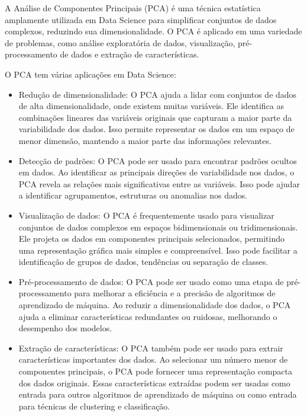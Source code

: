 \documentclass[12pt, a4paper]{article}
\begin{document}
A Análise de Componentes Principais (PCA) é uma técnica estatística amplamente utilizada em Data Science para simplificar conjuntos de dados complexos, reduzindo sua dimensionalidade. O PCA é aplicado em uma variedade de problemas, como análise exploratória de dados, visualização, pré-processamento de dados e extração de características.

O PCA tem várias aplicações em Data Science:

\begin{itemize}
    \item Redução de dimensionalidade: O PCA ajuda a lidar com conjuntos de dados de alta dimensionalidade, onde existem muitas variáveis. Ele identifica as combinações lineares das variáveis originais que capturam a maior parte da variabilidade dos dados. Isso permite representar os dados em um espaço de menor dimensão, mantendo a maior parte das informações relevantes.
    
    \item Detecção de padrões: O PCA pode ser usado para encontrar padrões ocultos em dados. Ao identificar as principais direções de variabilidade nos dados, o PCA revela as relações mais significativas entre as variáveis. Isso pode ajudar a identificar agrupamentos, estruturas ou anomalias nos dados.
    
    \item Visualização de dados: O PCA é frequentemente usado para visualizar conjuntos de dados complexos em espaços bidimensionais ou tridimensionais. Ele projeta os dados em componentes principais selecionados, permitindo uma representação gráfica mais simples e compreensível. Isso pode facilitar a identificação de grupos de dados, tendências ou separação de classes.
    
    \item Pré-processamento de dados: O PCA pode ser usado como uma etapa de pré-processamento para melhorar a eficiência e a precisão de algoritmos de aprendizado de máquina. Ao reduzir a dimensionalidade dos dados, o PCA ajuda a eliminar características redundantes ou ruidosas, melhorando o desempenho dos modelos.
    
    \item Extração de características: O PCA também pode ser usado para extrair características importantes dos dados. Ao selecionar um número menor de componentes principais, o PCA pode fornecer uma representação compacta dos dados originais. Essas características extraídas podem ser usadas como entrada para outros algoritmos de aprendizado de máquina ou como entrada para técnicas de clustering e classificação.
    \end{itemize}
\end{document}
